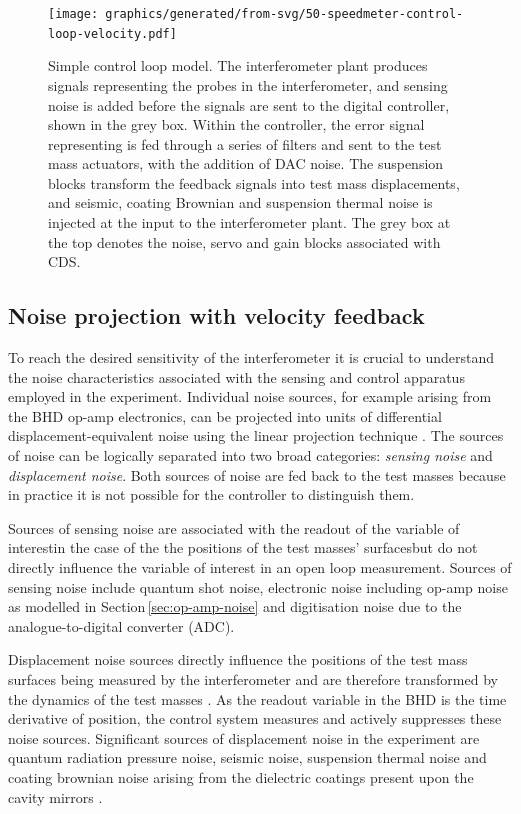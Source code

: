 \begin{figure}
  \texttt{[image: graphics/generated/from-svg/50-speedmeter-control-loop-velocity.pdf]}
  \caption[Modelled \SSMEXPT{} control loop using velocity feedback]{\label{fig:ssm-control-loop-velocity}Simple \SSM{} control loop model. The interferometer plant produces signals representing the probes in the interferometer, and sensing noise is added before the signals are sent to the digital controller, shown in the grey box. Within the controller, the error signal representing \LMINUS{} is fed through a series of filters and sent to the test mass actuators, with the addition of DAC noise. The suspension blocks transform the feedback signals into test mass displacements, and seismic, coating Brownian and suspension thermal noise is injected at the input to the interferometer plant. The grey box at the top denotes the noise, servo and gain blocks associated with CDS. }
\end{figure}

\subsection{\label{sec:noise-projection}Noise projection with velocity feedback}

To reach the desired sensitivity of the interferometer it is crucial to understand the noise characteristics associated with the sensing and control apparatus employed in the experiment. Individual noise sources, for example arising from the \gls{BHD} op-amp electronics, can be projected into units of differential displacement-equivalent noise using the linear projection technique \cite{Smith2006}. The sources of noise can be logically separated into two broad categories: \emph{sensing noise} and \emph{displacement noise}. Both sources of noise are fed back to the test masses because in practice it is not possible for the controller to distinguish them.

Sources of sensing noise are associated with the readout of the variable of interest\textemdash in the case of the \SSM{} the positions of the test masses' surfaces\textemdash but do not directly influence the variable of interest in an open loop measurement. Sources of sensing noise include quantum shot noise, electronic noise including op-amp noise as modelled in Section\,\ref{sec:op-amp-noise} and digitisation noise due to the analogue-to-digital converter (\gls{ADC}).

Displacement noise sources directly influence the positions of the test mass surfaces being measured by the interferometer and are therefore transformed by the dynamics of the test masses \cite{Danilishin2015}. As the readout variable in the \gls{BHD} is the time derivative of position, the control system measures and actively suppresses these noise sources. Significant sources of displacement noise in the \SSM{} experiment are quantum radiation pressure noise, seismic noise, suspension thermal noise \cite{Hammond2012} and coating brownian noise arising from the dielectric coatings present upon the cavity mirrors \cite{Harry2002}.

